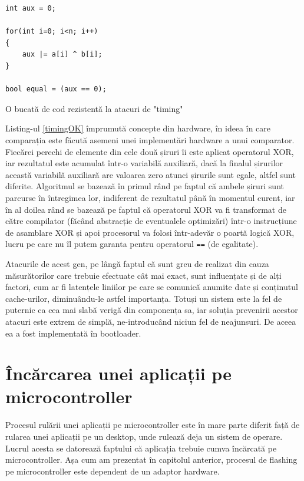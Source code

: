 \documentclass[12pt,a4paper,titlepage]{report}
\begin{document}
\begin{listing}[h]
\begin{verbatim}
int aux = 0;

for(int i=0; i<n; i++)
{
    aux |= a[i] ^ b[i];
}

bool equal = (aux == 0);
\end{verbatim}

\caption{O bucată de cod rezistentă la atacuri de "timing"}
\label{timingOK}
\end{listing}

Listing-ul \ref{timingOK} împrumută concepte din hardware, în ideea în care comparația este făcută asemeni unei implementări hardware a unui comparator. Fiecărei perechi de elemente din cele două șiruri îi este aplicat operatorul XOR, iar rezultatul este acumulat într-o variabilă auxiliară, dacă la finalul șirurilor această variabilă auxiliară are valoarea zero atunci șirurile sunt egale, altfel sunt diferite. Algoritmul se bazează în primul rând pe faptul că ambele șiruri sunt parcurse în întregimea lor, indiferent de rezultatul până în momentul curent, iar în al doilea rând se bazează pe faptul că operatorul XOR va fi transformat de către compilator (făcând abstracție de eventualele optimizări) într-o instrucțiune de asamblare XOR și apoi procesorul va folosi într-adevăr o poartă logică XOR, lucru pe care nu îl putem garanta pentru operatorul \texttt{==} (de egalitate).

Atacurile de acest gen, pe lângă faptul că sunt greu de realizat din cauza măsurătorilor care trebuie efectuate cât mai exact, sunt influențate și de alți factori, cum ar fi latențele liniilor pe care se comunică anumite date și conținutul cache-urilor, diminuându-le astfel importanța. Totuși un sistem este la fel de puternic ca cea mai slabă verigă din componența sa, iar soluția prevenirii acestor atacuri este extrem de simplă, ne-introducând niciun fel de neajunsuri. De aceea ea a fost implementată în bootloader.

\section{Încărcarea unei aplicații pe microcontroller}
Procesul rulării unei aplicații pe microcontroller este în mare parte diferit față de rularea unei aplicații pe un desktop, unde rulează deja un sistem de operare. Lucrul acesta se datorează faptului că aplicația trebuie cumva încărcată pe microcontroller. Așa cum am prezentat în capitolul anterior, procesul de flashing pe microcontroller este dependent de un adaptor hardware.
\end{document}
